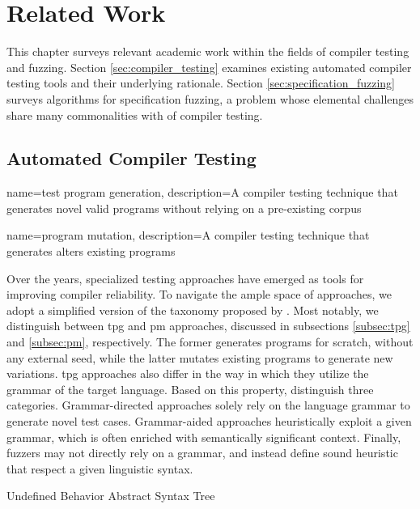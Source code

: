 \chapter{\label{cha:related}Related Work}

This chapter surveys relevant academic work within
the fields of compiler testing and fuzzing.
Section \ref{sec:compiler_testing} examines existing
automated compiler testing tools and their underlying rationale.
Section \ref{sec:specification_fuzzing} surveys algorithms
for specification fuzzing, a problem whose elemental challenges
share many commonalities with of compiler testing. 

\section{\label{sec:compiler_testing}Automated Compiler Testing}

{
        name=test program generation,
        description={A compiler testing technique
        that generates novel valid programs
        without relying on a pre-existing corpus}
}

{
        name=program mutation,
        description={A compiler testing technique
        that generates alters existing programs}
}

Over the years, specialized testing approaches have emerged
as tools for improving compiler reliability.
To navigate the ample space of approaches, we adopt a simplified
version of the taxonomy proposed by \citet{chen2020survey}. 
Most notably, we distinguish between \gls{tpg} and \gls{pm} approaches, discussed
in subsections \ref{subsec:tpg} and \ref{subsec:pm}, respectively.
The former generates programs for scratch, without any
external seed, while the latter mutates existing programs to generate
new variations. 
\Gls{tpg} approaches also differ in the way in which they
utilize the grammar of the target language.
Based on this property, \citet{chen2020survey} distinguish three
categories.
Grammar-directed approaches solely rely on the
language grammar to generate novel test cases.
Grammar-aided approaches heuristically exploit a given
grammar, which is often enriched with semantically
significant context. 
Finally, fuzzers may not directly rely on a grammar,
and instead define sound heuristic that respect
a given linguistic syntax.


 {Undefined Behavior}
 {Abstract Syntax Tree}

